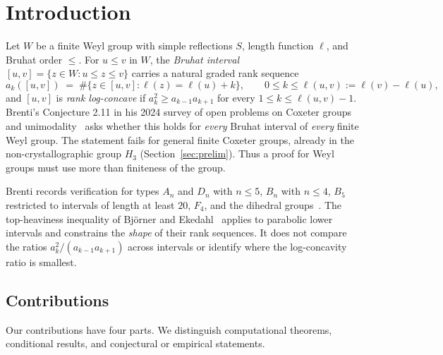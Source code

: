 \documentclass[11pt]{amsart}
\theoremstyle{plain}
\theoremstyle{definition}
\theoremstyle{remark}
\newcommand{\W}{W}
\begin{document}

\maketitle

\section{Introduction}
\label{sec:intro}

Let $\W$ be a finite Weyl group with simple reflections $S$, length function
$\ell$, and Bruhat order $\le$. For $u\le v$ in $\W$, the \emph{Bruhat
interval} $[u,v]=\{z\in \W : u\le z\le v\}$ carries a natural graded rank
sequence
\[
a_k([u,v]) \;=\; \#\{z\in[u,v] : \ell(z)=\ell(u)+k\}, \qquad 0\le k\le
\ell(u,v):=\ell(v)-\ell(u),
\]
and $[u,v]$ is \emph{rank log-concave} if $a_k^2\ge a_{k-1}a_{k+1}$ for every
$1\le k\le \ell(u,v)-1$. Brenti's Conjecture 2.11 in his 2024 survey of open problems on Coxeter
groups and unimodality~\cite{brenti2024open} asks whether this holds for
\emph{every} Bruhat interval of \emph{every} finite Weyl group. The
statement fails for general finite Coxeter groups, already in the
non-crystallographic group $H_3$ (Section~\ref{sec:prelim}). Thus a proof
for Weyl groups must use more than finiteness of the group.

Brenti records verification for types $A_n$ and $D_n$ with $n\le 5$,
$B_n$ with $n\le 4$, $B_5$ restricted to intervals of length at least
$20$, $F_4$, and the dihedral groups~\cite{brenti2024open}. The
top-heaviness inequality of Bj\"orner and
Ekedahl~\cite{bjorner-ekedahl} applies to parabolic lower intervals and
constrains the \emph{shape} of their rank sequences. It does not compare
the ratios $a_k^2/(a_{k-1}a_{k+1})$ across intervals or identify where the
log-concavity ratio is smallest.

\subsection*{Contributions} Our contributions have four parts. We
distinguish computational theorems, conditional results, and conjectural or
empirical statements.
\end{document}
